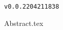 \documentclass{article}
\begin{document}
  \begin{titlepage}
    \centering
    \vspace*{2cm}
    \titleblock [2cm]
    \vspace{1cm}  %
    \authorblock
    \vfill  %
    \location \\
    \dateblock \\
    \footnotesize { \texttt{v0.0.2204211838} }
  \end{titlepage}

  {Abstract.tex}
\end{document}
